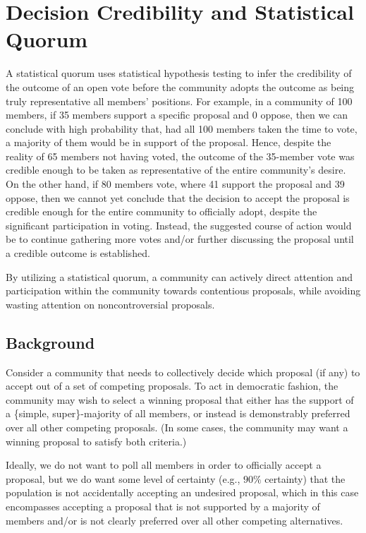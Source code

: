 \documentclass[format=acmsmall, review=true, screen=true, anonymous=true]{acmart}
\begin{document}
\section{Decision Credibility and Statistical Quorum}
\label{sec:decision-credibility}
A statistical quorum uses statistical hypothesis testing to infer the credibility of the outcome of an open vote before the community adopts the outcome as being truly representative all members' positions.
For example, in a community of 100 members, if 35 members support a specific proposal and 0 oppose, then we can conclude with high probability that, had all 100 members taken the time to vote, a majority of them would be in support of the proposal.  Hence, despite the reality of 65 members not having voted, the outcome of the 35-member vote was credible enough to be taken as representative of the entire community's desire.
On the other hand, if 80 members vote, where 41 support the proposal and 39 oppose, then we cannot yet conclude that the decision to accept the proposal is credible enough for the entire community to officially adopt, despite the significant participation in voting.
Instead, the suggested course of action would be to continue gathering more votes and/or further discussing the proposal until a credible outcome is established.

By utilizing a statistical quorum, a community can actively direct attention and participation within the community towards contentious proposals, while avoiding wasting attention on noncontroversial proposals.

\subsection{Background}
Consider a community that needs to collectively decide which proposal (if any) to accept out of a set of competing proposals.
To act in democratic fashion, the community may wish to select a winning proposal that either has the support of a \{simple, super\}-majority of all members, or instead is demonstrably preferred over all other competing proposals.  (In some cases, the community may want a winning proposal to satisfy both criteria.)

Ideally, we do not want to poll all members in order to officially accept a proposal, but we do want some level of certainty (e.g., $90\%$ certainty) that
the population is not accidentally accepting an undesired proposal, which in this case encompasses accepting a proposal that is not supported by a majority of members and/or is not clearly preferred over all other competing alternatives.
\end{document}
